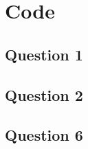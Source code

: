 \documentclass{article}
\begin{document}
\newpage
\newpage
\section{Code}
\subsection{Question 1}

\subsection{Question 2}

\subsection{Question 6}

\end{document}
